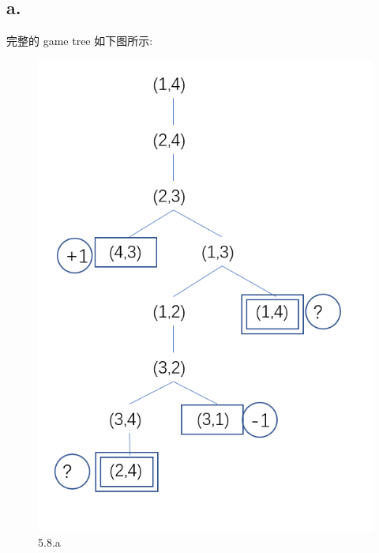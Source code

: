\documentclass[UTF8]{article}
\begin{document}
\subsection*{a.}
完整的 game tree 如下图所示:
\begin{figure}[H]
	\centering
	\includegraphics[width=\linewidth/2]{image/5.8.a.png}
	\caption{5.8.a}
\end{figure}\par
\end{document}
